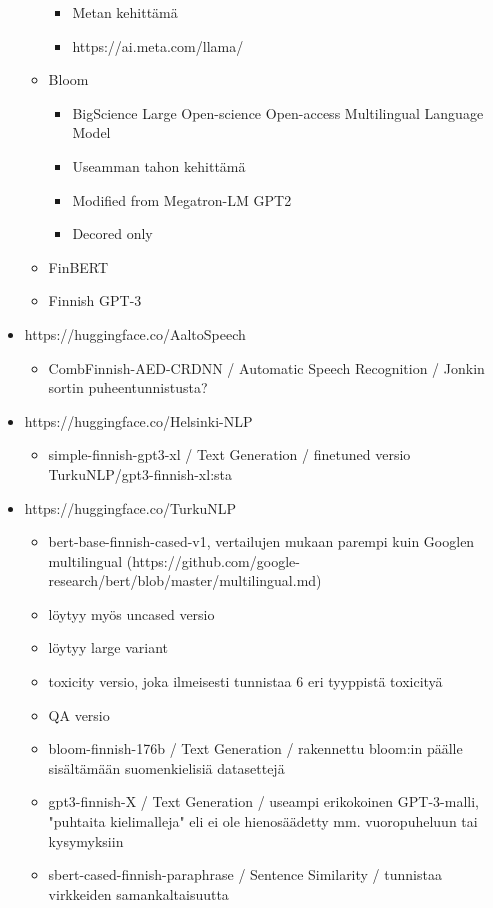 \begin{itemize}
\begin{itemize}
\begin{itemize}
      \item Metan kehittämä
      \item https://ai.meta.com/llama/
    \end{itemize}
    \item Bloom
    \begin{itemize}
      \item BigScience Large Open-science Open-access Multilingual Language Model
      \item Useamman tahon kehittämä
      \item Modified from Megatron-LM GPT2
      \item Decored only
    \end{itemize}
    \item FinBERT
    \item Finnish GPT-3
  \end{itemize}
  \item https://huggingface.co/AaltoSpeech
  \begin{itemize}
    \item CombFinnish-AED-CRDNN / Automatic Speech Recognition / Jonkin sortin puheentunnistusta?
  \end{itemize}
  \item https://huggingface.co/Helsinki-NLP
  \begin{itemize}
    \item simple-finnish-gpt3-xl / Text Generation / finetuned versio TurkuNLP/gpt3-finnish-xl:sta
  \end{itemize}
  \item https://huggingface.co/TurkuNLP
  \begin{itemize}
    \item bert-base-finnish-cased-v1, vertailujen mukaan parempi kuin Googlen multilingual (https://github.com/google-research/bert/blob/master/multilingual.md)
    \item löytyy myös uncased versio
    \item löytyy large variant
    \item toxicity versio, joka ilmeisesti tunnistaa 6 eri tyyppistä toxicityä
    \item QA versio
    \item bloom-finnish-176b / Text Generation / rakennettu bloom:in päälle sisältämään suomenkielisiä datasettejä
    \item gpt3-finnish-X / Text Generation / useampi erikokoinen GPT-3-malli, "puhtaita kielimalleja" eli ei ole hienosäädetty mm. vuoropuheluun tai kysymyksiin
    \item sbert-cased-finnish-paraphrase / Sentence Similarity / tunnistaa virkkeiden samankaltaisuutta

\end{itemize}
\end{itemize}
